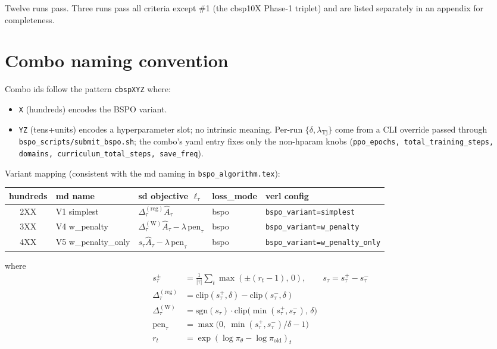 \documentclass[10pt]{article}
\begin{document}
\noindent Twelve runs pass. Three runs pass all criteria except
\#1 (the cbsp10X Phase-1 triplet) and are listed separately in an
appendix for completeness.

\section{Combo naming convention}

Combo ids follow the pattern \texttt{cbspXYZ} where:

\begin{itemize}
\item \texttt{X} (hundreds) encodes the BSPO variant.
\item \texttt{YZ} (tens+units) encodes a hyperparameter slot; no
  intrinsic meaning. Per-run $\{\delta, \lambda_{\mathrm{Tj}}\}$ come
  from a CLI override passed through
  \texttt{bspo\_scripts/submit\_bspo.sh}; the combo's yaml entry fixes
  only the non-hparam knobs (\texttt{ppo\_epochs, total\_training\_steps,
  domains, curriculum\_total\_steps, save\_freq}).
\end{itemize}

\noindent Variant mapping (consistent with the md naming in
\texttt{bspo\_algorithm.tex}):

\begin{center}
\begin{tabular}{cll>{\ttfamily}ll}
\toprule
hundreds & md name              & sd objective $\ell_\tau$                                 & loss\_mode & verl config \\
\midrule
2XX      & V1 simplest          & $\Delta_\tau^{(\mathrm{reg})}\hat A_\tau$                & bspo       & \texttt{bspo\_variant=simplest} \\
3XX      & V4 w\_penalty        & $\Delta_\tau^{(\mathrm{W})}\hat A_\tau - \lambda\,\mathrm{pen}_\tau$ & bspo & \texttt{bspo\_variant=w\_penalty} \\
4XX      & V5 w\_penalty\_only  & $s_\tau\hat A_\tau - \lambda\,\mathrm{pen}_\tau$         & bspo       & \texttt{bspo\_variant=w\_penalty\_only} \\
\bottomrule
\end{tabular}
\end{center}

\noindent where
\begin{align*}
s_\tau^\pm                   &= \tfrac{1}{|\tau|}\sum_t \max(\pm(r_t - 1),\,0),\qquad s_\tau = s_\tau^+ - s_\tau^- \\
\Delta_\tau^{(\mathrm{reg})} &= \mathrm{clip}(s_\tau^+, \delta) - \mathrm{clip}(s_\tau^-, \delta) \\
\Delta_\tau^{(\mathrm{W})}   &= \mathrm{sgn}(s_\tau)\cdot \mathrm{clip}\bigl(\min(s_\tau^+, s_\tau^-),\, \delta\bigr) \\
\mathrm{pen}_\tau            &= \max\bigl(0,\ \min(s_\tau^+, s_\tau^-)/\delta - 1\bigr) \\
r_t &= \exp(\log\pi_\theta - \log\pi_{\mathrm{old}})_t
\end{align*}
\end{document}
